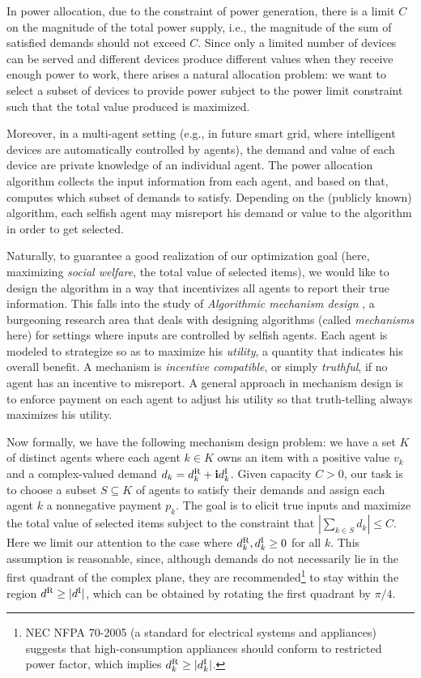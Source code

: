 \documentclass{aamas2013}
\begin{document}
In power allocation, due to the constraint of power generation, there is a limit $C$ on the magnitude of the total power supply, i.e., the magnitude of the sum of satisfied demands should not exceed $C$.  Since only a limited number of devices can be served and different devices produce different values when they receive enough power to work,   
there arises a natural allocation problem: we want to select a subset of devices to provide power subject to the power limit constraint such that the total value produced is maximized.

Moreover, in a multi-agent setting (e.g., in future smart grid, where intelligent devices are automatically controlled by agents), the demand and value of each device are private knowledge of an individual agent.  The power allocation algorithm collects the input information from each agent, and based on that, computes which subset of demands to satisfy.  Depending on the (publicly known) algorithm, each selfish agent may misreport his demand or value to the algorithm in order to get selected.  

Naturally, to guarantee a good realization of our optimization goal (here, maximizing {\em social welfare}, the total value of selected items), we would like to design the algorithm in a way that incentivizes all agents to report their true information.  
This falls into the study of {\em Algorithmic mechanism design} \cite{N07book,NR01alg}, a burgeoning research area that deals with designing algorithms (called {\em mechanisms} here) for settings where inputs are controlled by selfish agents.  
Each agent is modeled to strategize so as to maximize his {\em utility}, a quantity that indicates his overall benefit.
A mechanism is {\em incentive compatible}, or simply {\em truthful}, if no agent has an incentive to misreport.
A general approach in mechanism design is to enforce payment on each agent to adjust his utility so that truth-telling always maximizes his utility.   

Now formally, we have the following mechanism design problem: we have a set $K$ of distinct agents where each agent $k\in K$ owns an item with a positive value $v_k$ and a complex-valued demand $d_k=d^{\rm R}_k + {\bf i} d^{\rm I}_k$.  Given capacity $C>0$, our task is to choose a subset $S\subseteq K$ of agents to satisfy their demands and assign each agent $k$ a nonnegative payment $p_k$.  The goal is to elicit true inputs and maximize the total value of selected items subject to the constraint that $|\sum_{k\in S} d_k|\leq C$.       	
Here we limit our attention to the case where $d^{\rm R}_k, d^{\rm I}_k\geq 0$ for all $k$. This assumption is reasonable, since, although demands do not necessarily lie in the first quadrant of the complex plane, they are recommended\footnote{NEC NFPA 70-2005 (a standard for electrical systems and appliances) suggests that high-consumption appliances should conform to restricted power factor, which implies $d^{\rm R}_k \geq |d^{\rm I}_k|$.} to stay within the region $d^{\rm R} \geq |d^{\rm I}|$, which can be obtained by rotating the first quadrant by $\pi/4$.
 
\end{document}
